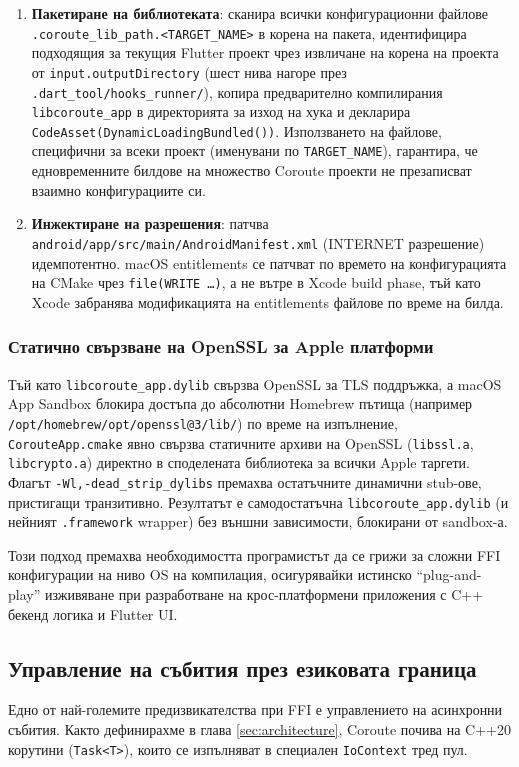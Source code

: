 \begin{enumerate}
    \item \textbf{Пакетиране на библиотеката}: сканира всички конфигурационни файлове \texttt{.coroute\_lib\_path.<TARGET\_NAME>} в корена на пакета, идентифицира подходящия за текущия Flutter проект чрез извличане на корена на проекта от \texttt{input.outputDirectory} (шест нива нагоре през \texttt{.dart\_tool/hooks\_runner/}), копира предварително компилирания \texttt{libcoroute\_app} в директорията за изход на хука и декларира \texttt{CodeAsset(DynamicLoadingBundled())}. Използването на файлове, специфични за всеки проект (именувани по \texttt{TARGET\_NAME}), гарантира, че едновременните билдове на множество Coroute проекти не презаписват взаимно конфигурациите си.
    \item \textbf{Инжектиране на разрешения}: патчва \texttt{android/app/src/main/AndroidManifest.xml} (INTERNET разрешение) идемпотентно. macOS entitlements се патчват по времето на конфигурацията на CMake чрез \texttt{file(WRITE \ldots)}, а не вътре в Xcode build phase, тъй като Xcode забранява модификацията на entitlements файлове по време на билда.
\end{enumerate}

\subsubsection{Статично свързване на OpenSSL за Apple платформи}
Тъй като \texttt{libcoroute\_app.dylib} свързва OpenSSL за TLS поддръжка, а macOS App Sandbox блокира достъпа до абсолютни Homebrew пътища (например \texttt{/opt/homebrew/opt/openssl@3/lib/}) по време на изпълнение, \texttt{CorouteApp.cmake} явно свързва статичните архиви на OpenSSL (\texttt{libssl.a}, \texttt{libcrypto.a}) директно в споделената библиотека за всички Apple таргети. Флагът \texttt{-Wl,-dead\_strip\_dylibs} премахва остатъчните динамични stub-ове, пристигащи транзитивно. Резултатът е самодостатъчна \texttt{libcoroute\_app.dylib} (и нейният \texttt{.framework} wrapper) без външни зависимости, блокирани от sandbox-а.

Този подход премахва необходимостта програмистът да се грижи за сложни FFI конфигурации на ниво OS на компилация, осигурявайки истинско ``plug-and-play'' изживяване при разработване на крос-платформени приложения с C++ бекенд логика и Flutter UI.

\subsection{Управление на събития през езиковата граница}
Едно от най-големите предизвикателства при FFI е управлението на асинхронни събития. Както дефинирахме в глава \ref{sec:architecture}, Coroute почива на C++20 корутини (\texttt{Task<T>}), които се изпълняват в специален \texttt{IoContext} тред пул. 

